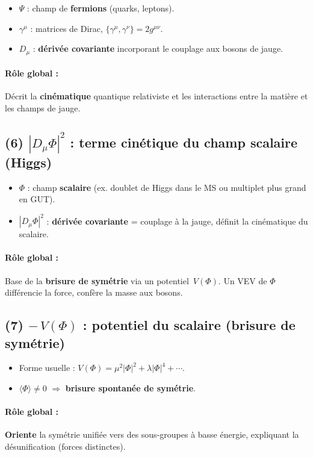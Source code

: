 \documentclass[12pt]{article}
\begin{document}
\begin{itemize}
\item \(\Psi\) : champ de \textbf{fermions} (quarks, leptons).
\item \(\gamma^\mu\) : matrices de Dirac, \(\{ \gamma^\mu,\gamma^\nu \}=2g^{\mu\nu}\).
\item \(D_\mu\) : \textbf{d\'eriv\'ee covariante} incorporant le couplage aux bosons de jauge.
\end{itemize}
\paragraph{R\^ole global :}
D\'ecrit la \textbf{cin\'ematique} quantique relativiste et les interactions 
entre la mati\`ere et les champs de jauge.

\subsection{(6) \(\displaystyle |D_\mu \Phi|^2\) : terme cin\'etique du champ scalaire (Higgs)}

\begin{itemize}
\item \(\Phi\) : champ \textbf{scalaire} (ex. doublet de Higgs dans le MS ou multiplet plus grand en GUT).
\item \(|D_\mu \Phi|^2\) : \textbf{d\'eriv\'ee covariante} = couplage \`a la jauge, 
      d\'efinit la cin\'ematique du scalaire.
\end{itemize}
\paragraph{R\^ole global :}
Base de la \textbf{brisure de sym\'etrie} via un potentiel \(\,V(\Phi)\). 
Un VEV de \(\Phi\) diff\'erencie la force, conf\`ere la masse aux bosons.

\subsection{(7) \(\displaystyle -\,V(\Phi)\) : potentiel du scalaire (brisure de sym\'etrie)}

\begin{itemize}
\item Forme usuelle : \(V(\Phi) = \mu^2|\Phi|^2 + \lambda|\Phi|^4 + \cdots\).
\item \(\langle \Phi\rangle \neq 0\) \(\Rightarrow\) \textbf{brisure spontan\'ee de sym\'etrie}.
\end{itemize}
\paragraph{R\^ole global :}
\textbf{Oriente} la sym\'etrie \og unifi\'ee\fg{} vers des sous-groupes \`a basse \'energie, 
expliquant la \og d\'esunification\fg{} (forces distinctes).
\end{document}
